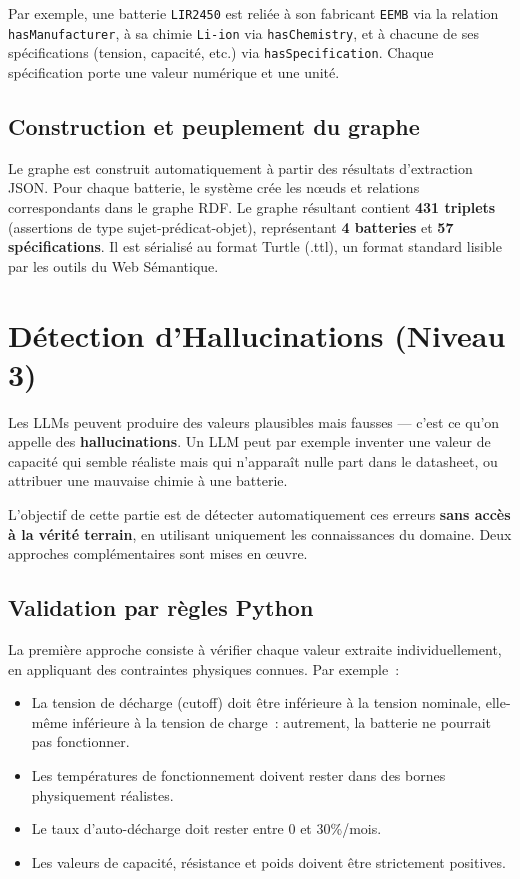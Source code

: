 \documentclass[12pt,a4paper]{article}
\begin{document}
Par exemple, une batterie \texttt{LIR2450} est reli\'ee \`a son fabricant \texttt{EEMB} via la relation \texttt{hasManufacturer}, \`a sa chimie \texttt{Li-ion} via \texttt{hasChemistry}, et \`a chacune de ses sp\'ecifications (tension, capacit\'e, etc.) via \texttt{hasSpecification}. Chaque sp\'ecification porte une valeur num\'erique et une unit\'e.

\subsection{Construction et peuplement du graphe}

Le graphe est construit automatiquement \`a partir des r\'esultats d'extraction JSON. Pour chaque batterie, le syst\`eme cr\'ee les n\oe uds et relations correspondants dans le graphe RDF. Le graphe r\'esultant contient \textbf{431 triplets} (assertions de type sujet-pr\'edicat-objet), repr\'esentant \textbf{4 batteries} et \textbf{57 sp\'ecifications}. Il est s\'erialis\'e au format Turtle (.ttl), un format standard lisible par les outils du Web S\'emantique.

\section{D\'etection d'Hallucinations (Niveau 3)}

Les LLMs peuvent produire des valeurs plausibles mais fausses --- c'est ce qu'on appelle des \textbf{hallucinations}. Un LLM peut par exemple inventer une valeur de capacit\'e qui semble r\'ealiste mais qui n'appara\^it nulle part dans le datasheet, ou attribuer une mauvaise chimie \`a une batterie.

L'objectif de cette partie est de d\'etecter automatiquement ces erreurs \textbf{sans acc\`es \`a la v\'erit\'e terrain}, en utilisant uniquement les connaissances du domaine. Deux approches compl\'ementaires sont mises en \oe uvre.

\subsection{Validation par r\`egles Python}

La premi\`ere approche consiste \`a v\'erifier chaque valeur extraite individuellement, en appliquant des contraintes physiques connues. Par exemple~:
\begin{itemize}[noitemsep]
    \item La tension de d\'echarge (cutoff) doit \^etre inf\'erieure \`a la tension nominale, elle-m\^eme inf\'erieure \`a la tension de charge~: autrement, la batterie ne pourrait pas fonctionner.
    \item Les temp\'eratures de fonctionnement doivent rester dans des bornes physiquement r\'ealistes.
    \item Le taux d'auto-d\'echarge doit rester entre 0 et 30\%/mois.
    \item Les valeurs de capacit\'e, r\'esistance et poids doivent \^etre strictement positives.
\end{itemize}
\end{document}
